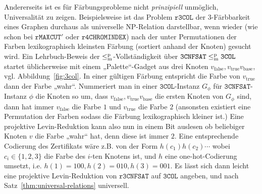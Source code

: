 Andererseits ist es für Färbungsprobleme nicht \emph{prinzipiell} unmöglich, Universalität zu zeigen. Beispielsweise ist das Problem $\mathtt{r3COL}$ der 3-Färbbarkeit eines Graphen durchaus als universelle NP-Relation darstellbar, wenn wieder (wie schon bei $\mathtt{rMAXCUT}'$ oder $\mathtt{r4CHROMINDEX}$) nach der unter Permutationen der Farben lexikographisch kleinsten Färbung (sortiert anhand der Knoten) gesucht wird.
Ein Lehrbuch-Beweis der $\leq_\mathrm{m}^\mathrm{p}$-Vollständigkeit über $\mathtt{3CNFSAT}\leq_\mathrm{m}^\mathrm{p}\mathtt{3COL}$ startet üblicherweise mit einem „Palette“-Gadget aus drei Knoten $v_{\text{false}}, v_{\text{true}} v_{\text{base}}$, vgl. Abbildung~\ref{fig:3col}. In einer gültigen Färbung entspricht die Farbe von $v_{\text{true}}$ dann der Farbe „wahr“. Nummeriert man in einer $\mathtt{3COL}$-Instanz $G_\phi$ für $\mathtt{3CNFSAT}$-Instanz $\phi$ die Knoten  so  um, dass $v_{\text{false}}, v_{\text{true}} v_{\text{base}}$ die ersten Knoten von $G_\phi$ sind, dann hat immer $v_{\text{false}}$ die Farbe $1$ und $v_{\text{true}}$ die Farbe $2$ (ansonsten existiert eine Permutation der Farben sodass die Färbung lexikographisch kleiner ist.)
Eine projektive Levin-Reduktion kann also nun in einem Bit auslesen ob beliebiger Knoten $v$ die Farbe „wahr“ hat, denn diese ist immer $2$.
Eine entsprechende Codierung des Zertifikats wäre z.B. von der Form $h(c_1)h(c_2)\cdots$ wobei $c_i\in\{1,2,3\}$ die Farbe des $i$-ten Knotens ist, und $h$ eine one-hot-Codierung umsetzt, i.e. $h(1)=100, h(2)=010, h(3)=001$. Es lässt sich dann leicht eine projektive Levin-Reduktion von $\mathtt{r3CNFSAT}$ auf $\mathtt{3COL}$ angeben, und nach Satz~\ref{thm:universal-relations} universell.

